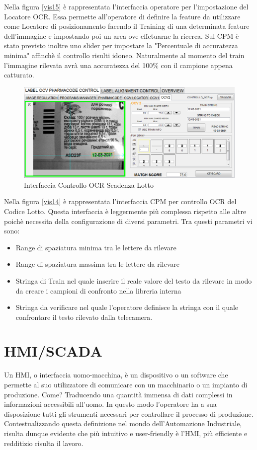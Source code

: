 \documentclass[12pt, a4paper, oneside]{book}
\begin{document}
Nella figura \ref{vis15} è rappresentata l'interfaccia operatore per l'impostazione del Locatore OCR. Essa permette all'operatore di definire la feature da utilizzare come Locatore di posizionamento facendo il Training di una determinata feature dell'immagine e impostando poi un area ove effetuarne la ricerca. Sul CPM è stato previsto inoltre uno slider per impostare la "Percentuale di accuratezza minima" affinchè il controllo risulti idoneo. Naturalmente al momento del train l'immagine rilevata avrà una accuratezza del 100\% con il campione appena catturato.

\begin{figure}[H]
	\centering
	\includegraphics[width=13cm]{Immagini/VIS16}
	\caption{Interfaccia Controllo OCR Scadenza Lotto}
	\label{vis16}
\end{figure}

Nella figura \ref{vis14} è rappresentata l'interfaccia CPM per controllo OCR del Codice Lotto. Questa interfaccia è leggermente più complessa rispetto alle altre poichè necessita della configurazione di diversi parametri. Tra questi parametri vi sono:
\begin{itemize}
	\item Range di spaziatura minima tra le lettere da rilevare
	\item Range di spaziatura massima tra le lettere da rilevare
	\item Stringa di Train nel quale inserire il reale valore del testo da rilevare in modo da creare i campioni di confronto nella libreria interna
	\item Stringa da verificare nel quale l'operatore definisce la stringa con il quale confrontare il testo rilevato dalla telecamera. 
\end{itemize}

\chapter{HMI/SCADA}
Un HMI, o interfaccia uomo-macchina, è un dispositivo o un software che permette al suo utilizzatore di comunicare con un macchinario o un impianto di produzione. Come? Traducendo una quantità immensa di dati complessi in informazioni accessibili all’uomo. In questo modo l’operatore ha a sua disposizione tutti gli strumenti necessari per controllare il processo di produzione.
Contestualizzando questa definizione nel mondo dell’Automazione Industriale, risulta dunque evidente che più intuitivo e user-friendly è l’HMI, più efficiente e redditizio risulta il lavoro.
\end{document}
